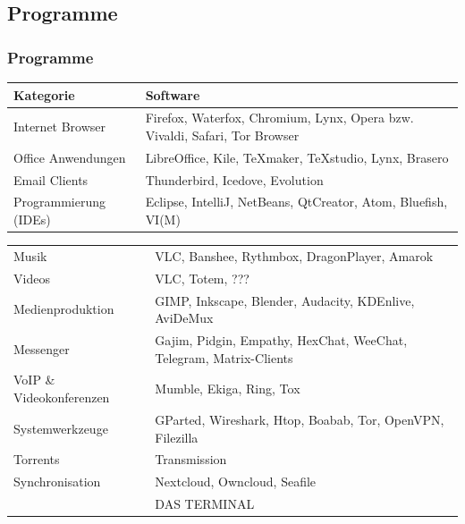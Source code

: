 \subsection{Programme}
\begin{frame}
 \frametitle{Programme}
 \begin{tabular}{lp{5cm}}
 Kategorie& Software \\ \hline
 Internet Browser & Firefox, Waterfox, Chromium, Lynx, Opera bzw. Vivaldi, Safari, Tor Browser \\
 Office Anwendungen & LibreOffice, Kile, TeXmaker, TeXstudio, Lynx, Brasero \\
 Email Clients & Thunderbird, Icedove, Evolution \\
 Programmierung (IDEs) & Eclipse, IntelliJ, NetBeans, QtCreator, Atom, Bluefish, VI(M) \\
 
 \end{tabular}

  \end{frame}
   \begin{tabular}{lp{5cm}}

 Musik & VLC, Banshee, Rythmbox, DragonPlayer, Amarok \\
 Videos & VLC, Totem, ??? \\
 Medienproduktion & GIMP, Inkscape, Blender, Audacity, KDEnlive, AviDeMux \\
 Messenger & Gajim, Pidgin, Empathy, HexChat, WeeChat, Telegram, Matrix-Clients \\
 VoIP \& Videokonferenzen & Mumble, Ekiga, Ring, Tox \\
 Systemwerkzeuge & GParted, Wireshark, Htop, Boabab, Tor, OpenVPN, Filezilla \\
 Torrents & Transmission \\
 Synchronisation & Nextcloud, Owncloud, Seafile \\
 &DAS TERMINAL \\
 \end{tabular}
  
  \begin{frame}
   
  \end{frame}




